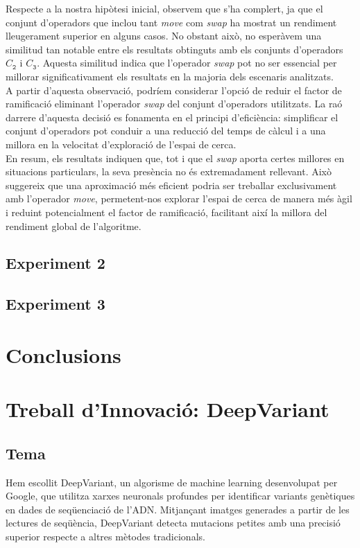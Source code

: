 \documentclass[a4paper]{article}
\begin{document}
	Respecte a la nostra hipòtesi inicial, observem que s'ha complert, ja que el conjunt d'operadors que inclou tant \textit{move} com \textit{swap} ha mostrat un rendiment lleugerament superior en alguns casos. No obstant això, no esperàvem una similitud tan notable entre els resultats obtinguts amb els conjunts d'operadors $C_{\texttt{2}}$ i $C_{\texttt{3}}$. Aquesta similitud indica que l'operador \textit{swap} pot no ser essencial per millorar significativament els resultats en la majoria dels escenaris analitzats. \\
	
	A partir d'aquesta observació, podríem considerar l'opció de reduir el factor de ramificació eliminant l'operador \textit{swap} del conjunt d'operadors utilitzats. La raó darrere d'aquesta decisió es fonamenta en el principi d'eficiència: simplificar el conjunt d'operadors pot conduir a una reducció del temps de càlcul i a una millora en la velocitat d'exploració de l'espai de cerca. \\
	
	En resum, els resultats indiquen que, tot i que el \textit{swap} aporta certes millores en situacions particulars, la seva presència no és extremadament rellevant. Això suggereix que una aproximació més eficient podria ser treballar exclusivament amb l'operador \textit{move}, permetent-nos explorar l'espai de cerca de manera més àgil i reduint potencialment el factor de ramificació, facilitant així la millora del rendiment global de l'algoritme. \\
	
	
	\subsection{Experiment 2}
	
	\subsection{Experiment 3}
	
	\newpage
	\section{Conclusions}
	
	
	\newpage
	\section{Treball d'Innovació: DeepVariant}
	
	\subsection{Tema}
	Hem escollit DeepVariant, un algorisme de machine learning desenvolupat per Google, que utilitza xarxes neuronals profundes per identificar variants genètiques en dades de seqüenciació de l'ADN. Mitjançant imatges generades a partir de les lectures de seqüència, DeepVariant detecta mutacions petites amb una precisió superior respecte a altres mètodes tradicionals.
	
\end{document}
